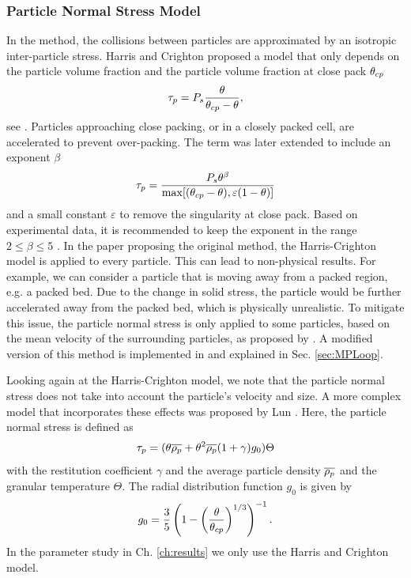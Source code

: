 \subsubsection{Particle Normal Stress Model}
\label{sec:particleNormalStress}
In the \MP method, the collisions between particles are approximated by an isotropic inter-particle stress. 
Harris and Crighton proposed a model that only depends on the particle volume fraction and the particle volume fraction at close pack $\theta_{cp}$
\begin{equation}
    \label{eq:solidStress}
    \tau_p = P_s \dfrac{\theta}{\theta_{cp} - \theta},
\end{equation}
see \cite{HarrisCrighton}.
Particles approaching close packing, or in a closely packed cell, are accelerated to prevent over-packing.
The term was later extended \cite{MPInterpolation} to include an exponent $\beta$
\begin{equation*}
    \tau_p = \dfrac{P_s \theta^\beta}{\max [( \theta_{cp} - \theta), \varepsilon ( 1- \theta)]}
\end{equation*}
and a small constant $\varepsilon$ to remove the singularity at close pack.
Based on experimental data, it is recommended to keep the exponent in the range $2 \leq \beta \leq 5$ \cite{betaRange}.
In the paper proposing the original method, the Harris-Crighton model is applied to every particle. 
This can lead to non-physical results.
For example, we can consider a particle that is moving away from a packed region, e.g. a packed bed. Due to the change in solid stress, the particle would be further accelerated away from the packed bed, which is physically unrealistic.
To mitigate this issue, the particle normal stress is only applied to some particles, based on the mean velocity of the surrounding particles, as proposed by \cite{MPInterpolation}.
A modified version of this method is implemented in \OF and explained in Sec. \ref{sec:MPLoop}.

Looking again at the Harris-Crighton model, we note that the particle normal stress does not take into account the particle’s velocity and size.
A more complex model that incorporates these effects was proposed by Lun \cite{Lun}.
Here, the particle normal stress is defined as
\begin{equation*}
    \tau_p = (\theta \overline{\rho_p} + \theta^2 \overline{\rho_p} (1 + \gamma) g_0) \Theta
\end{equation*}
with the restitution coefficient $\gamma$ and the average particle density $\overline{\rho_p}$ and the granular temperature $\Theta$. The radial distribution function $g_0$ is given by
\begin{equation*}
    g_0 = \dfrac{3}{5} \left( 1- \left( \dfrac{\theta}{\theta_{cp}} \right)^{1/3} \right)^{-1}.
\end{equation*}
In the parameter study in Ch. \ref{ch:results} we only use the Harris and Crighton model.


